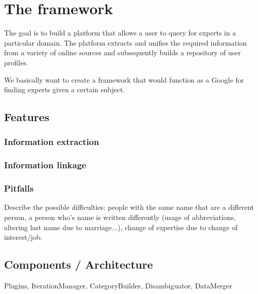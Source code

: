 \chapter{The framework}

The goal is to build a platform that allows a user to query for experts in a particular domain. The
platform extracts and unifies the required information from a variety of online sources and
subsequently builds a repository of user profiles.

We basically want to create a framework that would function as a Google for finding experts given a certain subject.


\section{Features}

\subsection{Information extraction}



\subsection{Information linkage}



\subsection{Pitfalls}

Describe the possible difficulties: people with the same name that are a different person, a person who's name is written differently (usage of abbreviations, altering last name due to marriage...), change of expertise due to change of interest/job.

\section{Components / Architecture}

Plugins, IterationManager, CategoryBuilder, Disambiguator, DataMerger

